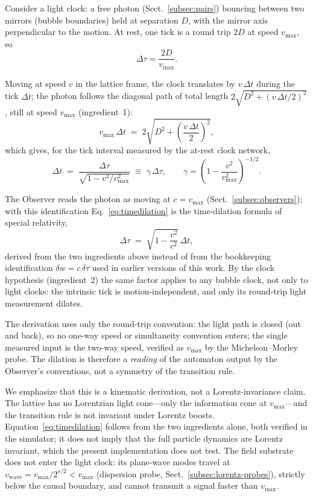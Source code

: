 \documentclass{ijuc}
\begin{document}
Consider a light clock: a free photon (Sect.~\ref{subsec:pairs}) bouncing between two mirrors (bubble boundaries) held at separation $D$, with the mirror axis perpendicular to the motion.  At rest, one tick is a round trip $2D$ at speed $v_{\max}$, so
\begin{equation}
\Delta\tau = \frac{2D}{v_{\max}} .
\label{eq:tick-rest}
\end{equation}

Moving at speed $v$ in the lattice frame, the clock translates by $v\,\Delta t$ during the tick $\Delta t$; the photon follows the diagonal path of total length $2\sqrt{D^{2}+(v\,\Delta t/2)^{2}}$, still at speed $v_{\max}$ (ingredient~1):
\begin{equation}
v_{\max}\,\Delta t \;=\; 2\sqrt{ D^{2} + \left(\frac{v\,\Delta t}{2}\right)^{2} } ,
\label{eq:lightclock}
\end{equation}
which gives, for the tick interval measured by the at-rest clock network,
\begin{equation}
\Delta t \;=\; \frac{\Delta\tau}{\sqrt{1-v^{2}/v_{\max}^{2}}} \;\equiv\; \gamma\,\Delta\tau , \qquad \gamma = \left(1-\frac{v^{2}}{v_{\max}^{2}}\right)^{-1/2}.
\label{eq:timedilation}
\end{equation}

The Observer reads the photon as moving at $c=v_{\max}$ (Sect.~\ref{subsec:observers}); with this identification Eq.~\eqref{eq:timedilation} is the time-dilation formula of special relativity,
\begin{equation}
\Delta\tau \;=\; \sqrt{1-\frac{v^{2}}{c^{2}}}\,\Delta t ,
\label{eq:timedilation-sr}
\end{equation}
derived from the two ingredients above instead of from the bookkeeping identification $\delta w=c\,\delta\tau$ used in earlier versions of this work.  By the clock hypothesis (ingredient~2) the same factor applies to any bubble clock, not only to light clocks: the intrinsic tick is motion-independent, and only its round-trip light measurement dilates.

The derivation uses only the round-trip convention: the light path is closed (out and back), so no one-way speed or simultaneity convention enters; the single measured input is the two-way speed, verified as $v_{\max}$ by the Michelson--Morley probe.  The dilation is therefore a \emph{reading} of the automaton output by the Observer's conventions, not a symmetry of the transition rule.

We emphasize that this is a kinematic derivation, not a Lorentz-invariance claim.  The lattice has no Lorentzian light cone---only the information cone at $v_{\max}$---and the transition rule is not invariant under Lorentz boosts.  Equation~\eqref{eq:timedilation} follows from the two ingredients alone, both verified in the simulator; it does not imply that the full particle dynamics are Lorentz invariant, which the present implementation does not test.  The field substrate does not enter the light clock: its plane-wave modes travel at $v_{\mathrm{wave}}=v_{\max}/2^{s/2}<v_{\max}$ (dispersion probe, Sect.~\ref{subsec:lorentz-probes}), strictly below the causal boundary, and cannot transmit a signal faster than $v_{\max}$.
\end{document}
